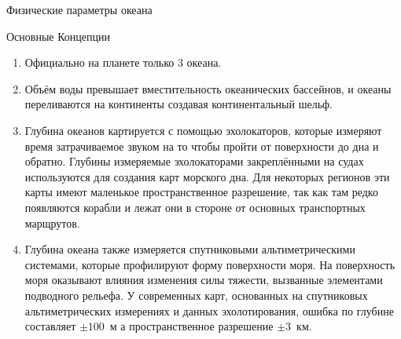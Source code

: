 \begin{chapter}{Физические параметры океана}
\begin{section}{Основные Концепции}
\begin{enumerate}
\item
Официально на планете только 3 океана.
%

\item
Объём воды превышает вместительность океанических бассейнов, и океаны
переливаются на континенты создавая континентальный шельф.
%

\item
Глубина океанов картируется с помощью эхолокаторов, которые измеряют
время затрачиваемое звуком на то чтобы пройти от поверхности до дна и
обратно. Глубины измеряемые эхолокаторами закреплёнными на судах
используются для создания карт морского дна. Для некоторых регионов
эти карты имеют маленькое пространственное разрешение, так как там
редко появляются корабли и лежат они в стороне от основных
транспортных марщрутов.
%

\item
Глубина океана также измеряется спутниковыми альтиметрическими
системами, которые профилируют форму поверхности моря. На поверхность
моря оказывают влияния изменения силы тяжести, вызванные элементами
подводного рельефа. У современных карт, основанных на спутниковых
альтиметрических измерениях и данных эхолотирования, ошибка по глубине
составляет $\pm 100$~м а пространственное разрешение $\pm 3$~км.
%


\end{enumerate}
\end{section}
\end{chapter}
